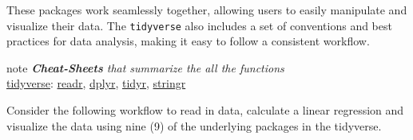 \documentclass[
]{book}
\begin{document}
These packages work seamlessly together, allowing users to easily manipulate and visualize their data. The \texttt{tidyverse} also includes a set of conventions and best practices for data analysis, making it easy to follow a consistent workflow.

\begin{infobox}{note}
\emph{\textbf{Cheat-Sheets} that summarize the all the functions}\\
\href{https://www.tidyverse.org/}{tidyverse}: \href{https://readr.tidyverse.org/}{readr},
\href{https://dplyr.tidyverse.org/}{dplyr}, \href{https://tidyr.tidyverse.org/}{tidyr},
\href{https://stringr.tidyverse.org/}{stringr}

\end{infobox}

\hfill\break
\hfill\break
Consider the following workflow to read in data, calculate a linear regression and visualize the data using nine (9) of the underlying packages in the tidyverse.
\end{document}
